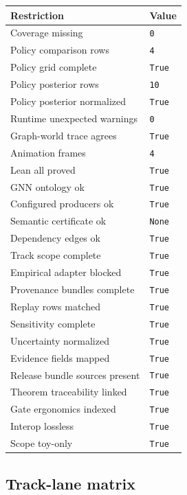 \documentclass[
  english,
]{article}
\newcounter{none} %
\begin{document}
{\def\LTcaptype{none} %
\begin{longtable}[]{@{}ll@{}}
\toprule\noalign{}
Restriction & Value \\
\midrule\noalign{}
\endhead
\bottomrule\noalign{}
\endlastfoot
Coverage missing & \texttt{0} \\
Policy comparison rows & \texttt{4} \\
Policy grid complete & \texttt{True} \\
Policy posterior rows & \texttt{10} \\
Policy posterior normalized & \texttt{True} \\
Runtime unexpected warnings & \texttt{0} \\
Graph-world trace agrees & \texttt{True} \\
Animation frames & \texttt{4} \\
Lean all proved & \texttt{True} \\
GNN ontology ok & \texttt{True} \\
Configured producers ok & \texttt{True} \\
Semantic certificate ok & \texttt{None} \\
Dependency edges ok & \texttt{True} \\
Track scope complete & \texttt{True} \\
Empirical adapter blocked & \texttt{True} \\
Provenance bundles complete & \texttt{True} \\
Replay rows matched & \texttt{True} \\
Sensitivity complete & \texttt{True} \\
Uncertainty normalized & \texttt{True} \\
Evidence fields mapped & \texttt{True} \\
Release bundle sources present & \texttt{True} \\
Theorem traceability linked & \texttt{True} \\
Gate ergonomics indexed & \texttt{True} \\
Interop lossless & \texttt{True} \\
Scope toy-only & \texttt{True} \\
\end{longtable}
}

\subsection{Track-lane matrix}\label{track-lane-matrix}
\end{document}
